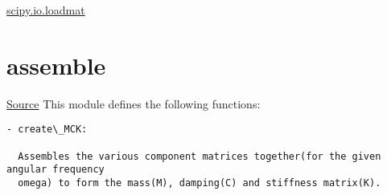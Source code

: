 \documentclass[letterpaper,10pt,english]{sphinxmanual}
\begin{document}
\href{http://docs.scipy.org/doc/scipy-0.14.0/reference/generated/scipy.io.loadmat.html}{scipy.io.loadmat}




\section{assemble}
\label{index:assemble}
\href{https://bitbucket.org/akadar/brakesqueal0.1/src/master/brake/initialize/assemble.py?at=master}{Source}
\label{index:module-brake.initialize.assemble}
This module defines the following functions:

\begin{Verbatim}[commandchars=\\\{\}]
- create\_MCK:

  Assembles the various component matrices together(for the given angular frequency
  omega) to form the mass(M), damping(C) and stiffness matrix(K).
\end{Verbatim}
\end{document}
